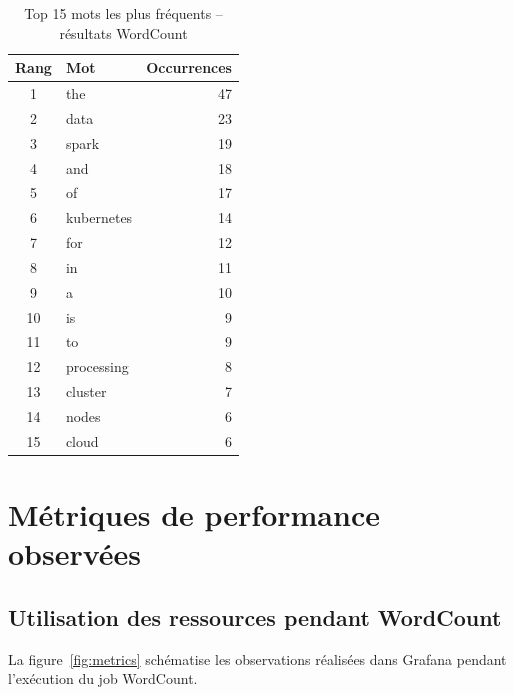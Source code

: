 \documentclass[12pt,a4paper,french]{report}
\begin{document}
\begin{table}[H]
\centering
\caption{Top 15 mots les plus fréquents -- résultats WordCount}
\label{tab:wordcount-results}
\begin{tabular}{clr}
\toprule
\textbf{Rang} & \textbf{Mot} & \textbf{Occurrences} \\
\midrule
1  & the      & 47 \\
2  & data     & 23 \\
3  & spark    & 19 \\
4  & and      & 18 \\
5  & of       & 17 \\
6  & kubernetes & 14 \\
7  & for      & 12 \\
8  & in       & 11 \\
9  & a        & 10 \\
10 & is       & 9  \\
11 & to       & 9  \\
12 & processing & 8 \\
13 & cluster  & 7  \\
14 & nodes    & 6  \\
15 & cloud    & 6  \\
\bottomrule
\end{tabular}
\end{table}

\section{Métriques de performance observées}

\subsection{Utilisation des ressources pendant WordCount}

La figure~\ref{fig:metrics} schématise les observations réalisées dans Grafana pendant l'exécution du job WordCount.
\end{document}
